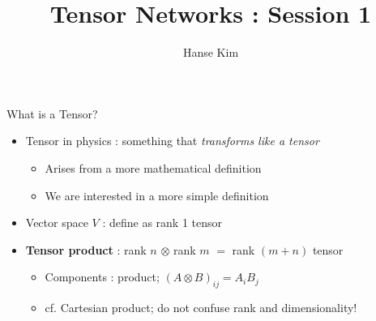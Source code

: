 \documentclass{beamer}
\title{Tensor Networks : Session 1}
\author{Hanse Kim}
\begin{document}
\begin{frame}
  \titlepage
\end{frame}

%

\begin{frame}{What is a Tensor?}
\begin{itemize}
	\item Tensor in physics : something that \textit{transforms like a tensor}
		\begin{itemize}
		\item Arises from a more mathematical definition
		\item We are interested in a more simple definition
		\end{itemize}

		\item Vector space ${ V }$ : define as rank 1 tensor
		\item \textbf{Tensor product} : rank ${ n }$ ${ \otimes  }$ rank ${ m }$ ${ = }$ rank ${ (m+n) }$ tensor
			\begin{itemize}
			\item Components : product; ${ (A \otimes B)_{ij}=A_{i}B_{j} }$
			\item cf. Cartesian product; do not confuse rank and dimensionality!
			\end{itemize}
\end{itemize}
\end{frame}
\end{document}
